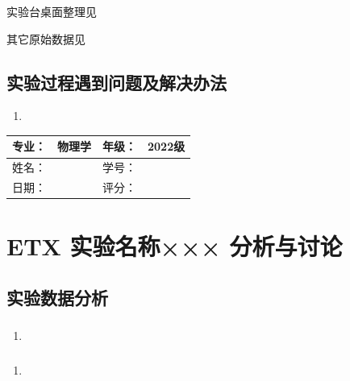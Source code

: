 \documentclass[dvipsnames, svgnames,a4paper,11pt]{article}
\begin{document}
	实验台桌面整理见%
	
	其它原始数据见%
	
	\subsection{实验过程遇到问题及解决办法}
	\begin{enumerate}
		\item 
	\end{enumerate}
	
	
	
	\clearpage
	
	\begin{table}
		\renewcommand\arraystretch{1.7}
		\begin{tabularx}{\textwidth}{|X|X|X|X|}
			\hline
			专业：& 物理学 &年级：& 2022级\\
			\hline
			姓名： &  & 学号：& \\
			\hline
			日期：&  & 评分： &\\
			\hline
		\end{tabularx}
	\end{table}
	
	\section{ETX 实验名称××× \quad\heiti 分析与讨论}
	
	\subsection{实验数据分析}
	
	\subsubsection{}
	\begin{enumerate}
		\item 
	\end{enumerate}
	
	\subsubsection{}
	\begin{enumerate}
		\item 
	\end{enumerate}
	
	\subsubsection{}
	
\end{document}
